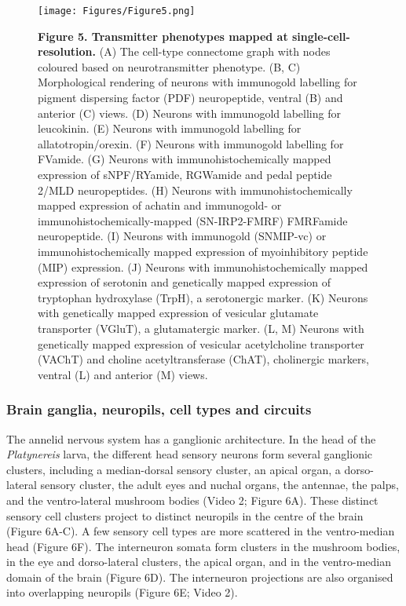 \documentclass[
  11pt,
]{article}
\begin{document}
\begin{figure}[H]

{\centering \texttt{[image: Figures/Figure5.png]}

}

\caption{\textbf{Figure 5. Transmitter phenotypes mapped at
single-cell-resolution. } (A) The cell-type connectome graph with nodes
coloured based on neurotransmitter phenotype. (B, C) Morphological
rendering of neurons with immunogold labelling for pigment dispersing
factor (PDF) neuropeptide, ventral (B) and anterior (C) views. (D)
Neurons with immunogold labelling for leucokinin. (E) Neurons with
immunogold labelling for allatotropin/orexin. (F) Neurons with
immunogold labelling for FVamide. (G) Neurons with immunohistochemically
mapped expression of sNPF/RYamide, RGWamide and pedal peptide 2/MLD
neuropeptides. (H) Neurons with immunohistochemically mapped expression
of achatin and immunogold- or immunohistochemically-mapped
(SN-IRP2-FMRF) FMRFamide neuropeptide. (I) Neurons with immunogold
(SNMIP-vc) or immunohistochemically mapped expression of myoinhibitory
peptide (MIP) expression. (J) Neurons with immunohistochemically mapped
expression of serotonin and genetically mapped expression of tryptophan
hydroxylase (TrpH), a serotonergic marker. (K) Neurons with genetically
mapped expression of vesicular glutamate transporter (VGluT), a
glutamatergic marker. (L, M) Neurons with genetically mapped expression
of vesicular acetylcholine transporter (VAChT) and choline
acetyltransferase (ChAT), cholinergic markers, ventral (L) and anterior
(M) views.}

\end{figure}%

\subsubsection{Brain ganglia, neuropils, cell types and
circuits}\label{brain-ganglia-neuropils-cell-types-and-circuits}

The annelid nervous system has a ganglionic architecture. In the head of
the \emph{Platynereis} larva, the different head sensory neurons form
several ganglionic clusters, including a median-dorsal sensory cluster,
an apical organ, a dorso-lateral sensory cluster, the adult eyes and
nuchal organs, the antennae, the palps, and the ventro-lateral mushroom
bodies (Video 2; Figure 6A). These distinct sensory cell clusters
project to distinct neuropils in the centre of the brain (Figure 6A-C).
A few sensory cell types are more scattered in the ventro-median head
(Figure 6F). The interneuron somata form clusters in the mushroom
bodies, in the eye and dorso-lateral clusters, the apical organ, and in
the ventro-median domain of the brain (Figure 6D). The interneuron
projections are also organised into overlapping neuropils (Figure 6E;
Video 2).
\end{document}
